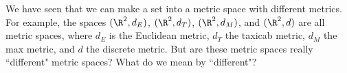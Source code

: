 \label{sec:equivalent_metric_spaces}


\vspace*{-17 pt}
\framebox{\hspace*{3 pt}
\parbox{4.7 in}{\begin{fqs}
\item 

\end{fqs}} \hspace*{3 pt}}

\vspace*{13 pt}


We have seen that we can make a set into a metric space with different metrics. For example, the spaces $(\R^2, d_E)$, $(\R^2, d_T)$, $(\R^2, d_M)$, and $(\R^2, d)$ are all metric spaces, where $d_E$ is the Euclidean metric, $d_T$ the taxicab metric, $d_M$ the max metric, and $d$ the discrete metric. But are these metric spaces really ``different" metric spaces? What do we mean by ``different"? 



